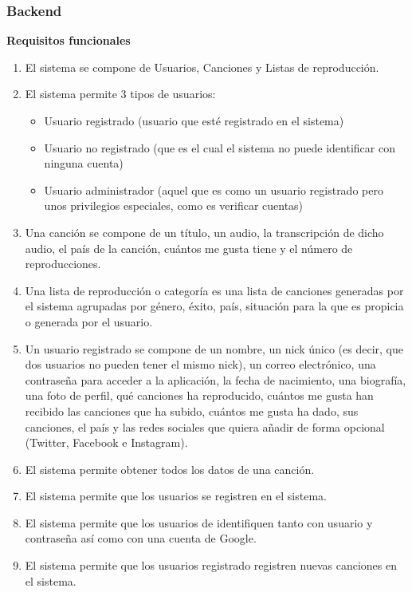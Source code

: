 \documentclass[12pt]{article}%
\begin{document}
\subsubsection{Backend}
\textbf{Requisitos funcionales}
\begin{enumerate}

	\item El sistema se compone de Usuarios, Canciones y Listas de reproducci\'on.
	\item El sistema permite 3 tipos de usuarios:
	\begin{itemize}
		\item Usuario registrado (usuario que est\'e registrado en el sistema)
		\item Usuario no registrado (que es el cual el sistema no puede identificar con ninguna cuenta)
		\item Usuario administrador (aquel que es como un usuario registrado pero unos privilegios especiales, como es verificar cuentas)
	\end{itemize}
	\item Una canci\'on se compone de un t\'itulo, un audio, la transcripci\'on de dicho audio, el pa\'is de la canci\'on, cu\'antos me gusta tiene y el n\'umero de reproducciones.
	\item Una lista de reproducci\'on o categor\'ia es una lista de canciones generadas por el sistema agrupadas por g\'enero, \'exito, pa\'is, situaci\'on para la que es propicia o generada por el usuario.
	\item Un usuario registrado se compone de un nombre, un nick \'unico (es decir, que dos usuarios no pueden tener el mismo nick), un correo electr\'onico, una contrase\~na para acceder a la aplicaci\'on, la fecha de nacimiento, una biograf\'ia, una foto de perfil, qu\'e canciones ha reproducido, cu\'antos me gusta han recibido las canciones que ha subido, cu\'antos me gusta ha dado, sus canciones, el pa\'is y las redes sociales que quiera a\~nadir de forma opcional (Twitter, Facebook e Instagram).
	
	\item El sistema permite obtener todos los datos de una canci\'on.
	
	
	\item El sistema permite que los usuarios se registren en el sistema.
	\item El sistema permite que los usuarios de identifiquen tanto con usuario y contraseña as\'i como con una cuenta de Google.
	\item El sistema permite que los usuarios registrado registren nuevas canciones en el sistema.
	

\end{enumerate}
\end{document}
